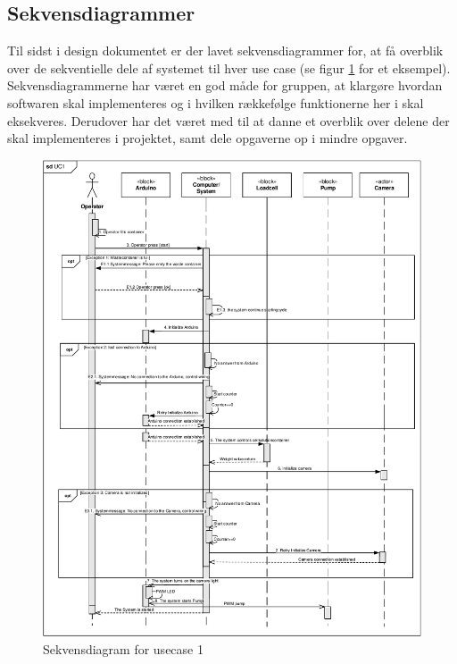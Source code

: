 \subsection{Sekvensdiagrammer}
Til sidst i design dokumentet er der lavet sekvensdiagrammer for, at få overblik over de sekventielle dele af systemet til hver use case (se figur \ref{fig:sekvendisgr} for et eksempel). Sekvensdiagrammerne har været en god måde for gruppen, at klargøre hvordan softwaren skal implementeres og i hvilken rækkefølge funktionerne her i skal eksekveres. Derudover har det været med til at danne et overblik over delene der skal implementeres i projektet, samt    dele opgaverne op i mindre opgaver.
\begin{figure}[H]
	\centering
	\includegraphics[width=1\textwidth]{pdf/UC1_cropped.pdf}
	\caption{Sekvensdiagram for usecase 1}
	\label{fig:sekvendisgr}
\end{figure}


